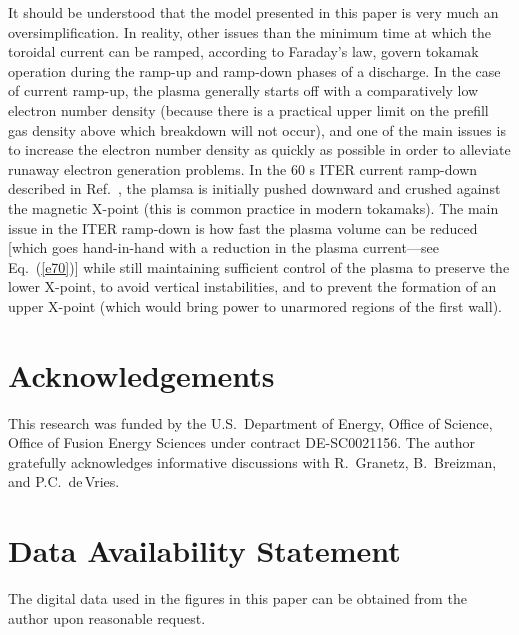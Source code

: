 \documentclass[12pt,prb,aps]{revtex4-1}
\begin{document}
It should be understood that the model presented in this paper is very much an oversimplification. In reality, other issues than the minimum time at which
the toroidal current can be ramped, according to Faraday's law, govern tokamak operation during the ramp-up and ramp-down phases of a discharge. 
In the case of current ramp-up, the plasma generally starts off with a comparatively low electron number density (because there is a practical upper limit
on the prefill gas density above which breakdown will not occur), and one of the main issues is to increase the electron number density as
quickly as possible in order to alleviate runaway electron generation problems. In the 60 s ITER current ramp-down described in Ref.~, the plamsa
is initially pushed downward and crushed against the magnetic X-point (this is common practice in modern tokamaks). The main issue
in the ITER ramp-down is how fast the plasma volume can be reduced [which goes hand-in-hand with a reduction in the plasma current---see Eq.~(\ref{e70})]
while still maintaining sufficient control of the plasma to preserve the lower X-point, to avoid vertical instabilities, and to prevent the formation of an
upper X-point (which would bring power to unarmored regions of the first wall).

\section*{Acknowledgements}
This research was funded by the  U.S.\ Department of Energy, Office of Science, Office of Fusion Energy Sciences under contract DE-SC0021156.
The author gratefully acknowledges informative discussions with R.~Granetz, B.~Breizman, and P.C.~de\,Vries. 

\section*{Data Availability Statement}
The digital data used in the figures in this paper can be obtained from the author upon reasonable request. 
\end{document}
